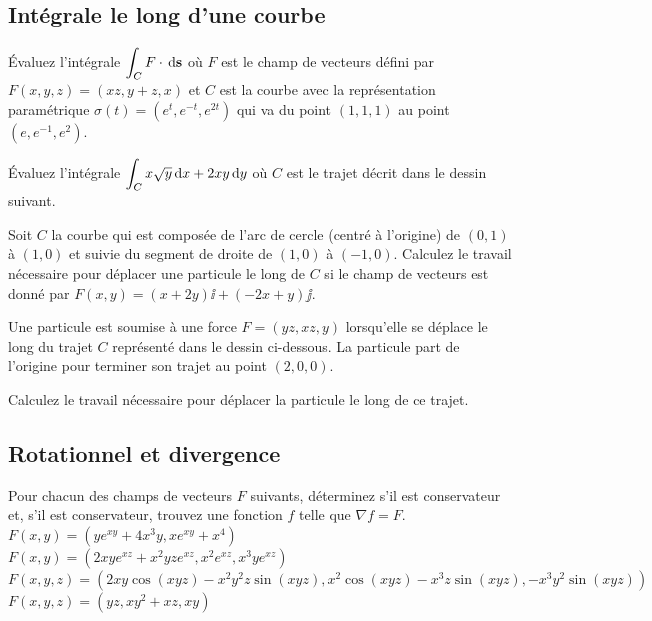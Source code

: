 \subsection{Intégrale le long d'une courbe}

\begin{question}
Évaluez l'intégrale $\displaystyle \int_C F \cdot \,\mathrm{d}\mathbf{s}$ où
$F$ est le champ de vecteurs défini par
$F(x,y,z) = (xz, y+z,x)$ et $C$ est la courbe avec la
représentation paramétrique 
$\sigma(t) = (e^t, e^{-t}, e^{2t})$ qui va du point $(1,1,1)$ au
point $(e,e^{-1}, e^2)$.
\label{17Q1}
\end{question}

\begin{question}
Évaluez l'intégrale
$\displaystyle \int_C x \sqrt{y} \,\mathrm{d}x + 2xy \,\mathrm{d}y$ où $C$
est le trajet décrit dans le dessin suivant.
\label{17Q2}
\end{question}

\begin{question}
Soit $C$ la courbe qui est composée de l'arc de cercle (centré à
l'origine) de $(0,1)$ à $(1,0)$ et suivie du segment de droite de
$(1,0)$ à $(-1,0)$.  Calculez le travail nécessaire pour
déplacer une particule le long de $C$ si le champ de vecteurs est
donné par $F(x,y) = (x+2y)\ii + (-2x+y)\jj$.
\label{17Q3}
\end{question}

\begin{question}
Une particule est soumise à une force $F = (yz,xz, y)$
lorsqu'elle se déplace le long du trajet $C$ représenté dans le dessin
ci-dessous.  La particule part de l'origine pour terminer son trajet au
point $(2,0,0)$.

Calculez le travail nécessaire pour déplacer la particule le long de
ce trajet.
\label{17Q4}
\end{question}

\subsection{Rotationnel et divergence}

\begin{question}
Pour chacun des champs de vecteurs $F$ suivants, déterminez
s'il est conservateur et, s'il est conservateur, trouvez une fonction
$f$ telle que $\nabla f = F$.\\
 $F(x,y) = (y e^{xy} + 4 x^3y, xe^{xy} + x^4)$\\
 $F(x,y) = (2xye^{xz} +x^2yze^{xz}, x^2e^{xz}, x^3ye^{xz})$ \\
 $F(x,y,z) = (2xy\cos(xyz) - x^2y^2z\sin(xyz),
x^2\cos(xyz) - x^3 z \sin(xyz),- x^3 y^2\sin(xyz))$ \\
 $F(x,y,z) = (yz, xy^2+xz, xy)$
\label{17Q5}
\end{question}

